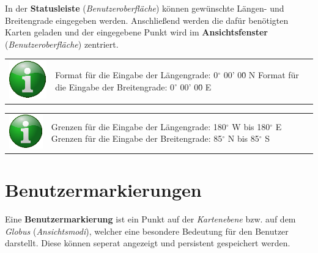 \documentclass[10pt]{scrreprt}
\newcommand{\textref}[1]{\mbox{\raisebox{0.1ex}{\small$\rightarrow$ }\textit{#1}}}
\begin{document}
In der \textbf{Statusleiste} (\textref{Benutzeroberfläche}) können gewünschte Längen- und Breitengrade eingegeben werden. Anschließend werden die dafür benötigten Karten geladen und der eingegebene Punkt wird im \textbf{Ansichtsfenster} (\textref{Benutzeroberfläche}) zentriert.

\vspace{3mm}
\begin{tabular}{>{\centering \arraybackslash}m{1cm} m{14cm}}
\includegraphics[scale=0.5]{images/info.eps} & \flushleft Format für die Eingabe der Längengrade: 0$^\circ$ 00' 00\"{} N \linebreak Format für die Eingabe der Breitengrade: 0$^\circ$ 00' 00\"{} E
\end{tabular}

\vspace{3mm}
\begin{tabular}{>{\centering \arraybackslash}m{1cm} m{14cm}}
\includegraphics[scale=0.5]{images/info.eps} & \flushleft Grenzen für die Eingabe der Längengrade: 180$^\circ$ W bis 180$^\circ$ E \linebreak Grenzen für die Eingabe der Breitengrade: 85$^\circ$ N bis 85$^\circ$ S
\end{tabular}





\newpage
\section{Benutzermarkierungen} 
Eine \textbf{Benutzermarkierung} ist ein Punkt auf der \textref{Kartenebene} bzw. auf dem \textref{Globus} (\textref{Ansichtsmodi}), welcher eine besondere Bedeutung für den Benutzer darstellt. Diese können seperat angezeigt und persistent gespeichert werden.\\
\end{document}
